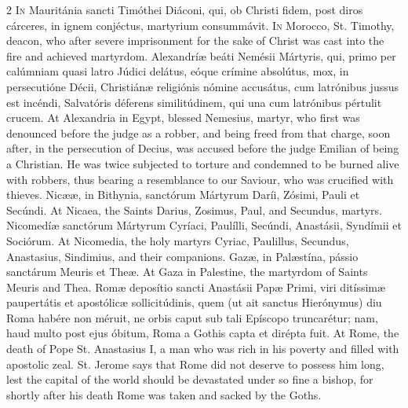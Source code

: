\begin{paracol}{2}
\lettrine[lines=2]{I}{n} Mauritánia sancti Timóthei Diáconi, qui, ob Christi fidem, post diros cárceres, in ignem conjéctus, martyrium consummávit.
\switchcolumn
{}
\lettrine[lines=2]{I}{n} Morocco, St. Timothy, deacon, who after severe imprisonment for the sake 
 of Christ was cast into the fire and achieved martyrdom.
\switchcolumn*
{}
Alexandríæ beáti Nemésii Mártyris, qui, primo 
 per calúmniam quasi latro Júdici delátus, eóque crímine absolútus, mox, in 
 persecutióne Décii, Christiánæ religiónis nómine accusátus, cum latrónibus 
 jussus est incéndi, Salvatóris déferens similitúdinem, qui una cum latrónibus 
 pértulit crucem.
\switchcolumn
{}
At Alexandria in Egypt, blessed Nemesius, martyr, who first was denounced 
 before the judge as a robber, and being freed from that charge, soon after, 
 in the persecution of Decius, was accused before the judge Emilian of being 
 a Christian. He was twice subjected to torture and condemned to be 
 burned alive with robbers, thus bearing a resemblance to our Saviour, who 
 was crucified with thieves.
\switchcolumn*
{}
Nicææ, in Bithynia, sanctórum Mártyrum Daríi, 
 Zósimi, Pauli et Secúndi.
\switchcolumn
{}
At Nicaea, the Saints Darius, Zosimus, Paul, and Secundus, martyrs.
\switchcolumn*
{}
Nicomedíæ sanctórum Mártyrum Cyríaci, Paulílli, 
 Secúndi, Anastásii, Syndímii et Sociórum.
\switchcolumn
{}
At Nicomedia, the holy martyrs Cyriac, Paulillus, Secundus, Anastasius, 
 Sindimius, and their companions.
\switchcolumn*
{}
Gazæ, in Palæstína, pássio sanctárum Meuris et 
 Theæ.
\switchcolumn
{}
At Gaza in Palestine, the martyrdom of Saints Meuris and Thea.
\switchcolumn*
{}
Romæ deposítio sancti Anastásii Papæ Primi, viri ditíssimæ paupertátis et
  apostólicæ sollicitúdinis, quem (ut ait sanctus Hierónymus) diu Roma habére
  non méruit, ne orbis caput sub tali Epíscopo truncarétur; nam, haud multo
  post ejus óbitum, Roma a Gothis capta et dirépta fuit.
\switchcolumn
{}
At Rome, the death of Pope St. Anastasius I, a man who was rich in his 
 poverty and filled with apostolic zeal. St. Jerome says that Rome did 
 not deserve to possess him long, lest the capital of the world should be 
 devastated under so fine a bishop, for shortly after his death Rome was 
 taken and sacked by the Goths.
\switchcolumn*
{}

\end{paracol}
